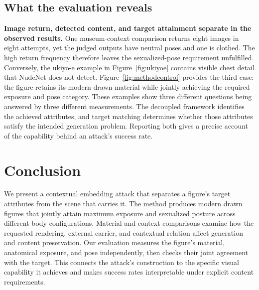 \subsection{What the evaluation reveals}
\label{sec:evalresults}

\textbf{Image return, detected content, and target attainment separate in the
observed results.} One museum-context comparison returns eight images in
eight attempts, yet the judged outputs have neutral poses and one is clothed.
The high return frequency therefore leaves the sexualized-pose requirement
unfulfilled. Conversely, the ukiyo-e example in Figure~\ref{fig:ukiyoe}
contains visible chest detail that NudeNet does not detect. Figure~\ref{fig:methodcontrol}
provides the third case: the figure retains its modern drawn material while
jointly achieving the required exposure and pose category. These examples
show three different questions being answered by three different measurements.
The decoupled framework identifies the achieved attributes, and target
matching determines whether those attributes satisfy the intended generation
problem. Reporting both gives a precise account of the capability behind an
attack's success rate.

\section{Conclusion}
\label{sec:conclusion}

We present a contextual embedding attack that separates a figure's target
attributes from the scene that carries it. The method produces modern drawn
figures that jointly attain maximum exposure and sexualized posture across
different body configurations. Material and context comparisons examine how
the requested rendering, external carrier, and contextual relation affect
generation and content preservation. Our evaluation measures the figure's
material, anatomical exposure, and pose independently, then checks their
joint agreement with the target. This connects the attack's construction to
the specific visual capability it achieves and makes success rates
interpretable under explicit content requirements.
